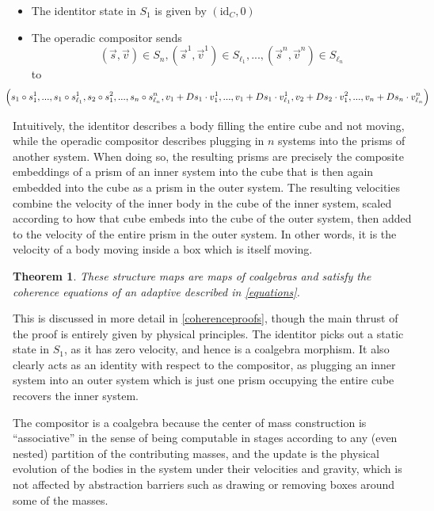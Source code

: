 \documentclass[11pt, one side, article]{memoir}
\theoremstyle{definition}
\theoremstyle{plain}
\newtheorem{theorem}[definitionx]{Theorem}
\newcommand{\id}{\mathrm{id}}
\newcommand{\0}{\textsf{0}}
\newcommand{\1}{\tn{\textsf{1}}}
\newcommand{\blp}{\Big{(}}
\newcommand{\brp}{\Big{)}}
\begin{document}
\begin{itemize}
	\item The identitor state in $S_1$ is given by $(\id_C,0)$
	\item The operadic compositor sends 
$$(\vec s,\vec v) \in S_n, (\vec s^1,\vec v^1) \in S_{\ell_1},...,(\vec s^n,\vec v^n) \in S_{\ell_n}$$
to
$$\hspace{-1cm}\blp s_1 \circ s^1_1,...,s_1 \circ s^1_{\ell_1},s_2 \circ s^2_1,...,s_n \circ s^n_{\ell_n},v_1 + Ds_1 \cdot v^1_1,...,v_1 + Ds_1 \cdot v^1_{\ell_1},v_2 + Ds_2 \cdot v^2_1,...,v_n + Ds_n \cdot v^n_{\ell_n} \brp$$
\end{itemize}

Intuitively, the identitor describes a body filling the entire cube and not moving, while the operadic compositor describes plugging in $n$ systems into the prisms of another system. When doing so, the resulting prisms are precisely the composite embeddings of a prism of an inner system into the cube that is then again embedded into the cube as a prism in the outer system. The resulting velocities combine the velocity of the inner body in the cube of the inner system, scaled according to how that cube embeds into the cube of the outer system, then added to the velocity of the entire prism in the outer system. In other words, it is the velocity of a body moving inside a box which is itself moving.

\begin{theorem}\label{gravityadaptive}
These structure maps are maps of coalgebras and satisfy the coherence equations of an adaptive described in \cref{equations}.
\end{theorem}

This is discussed in more detail in \cref{coherenceproofs}, though the main thrust of the proof is entirely given by physical principles. The identitor picks out a static state in $S_1$, as it has zero velocity, and hence is a coalgebra morphism. It also clearly acts as an identity with respect to the compositor, as plugging an inner system into an outer system which is just one prism occupying the entire cube recovers the inner system. 

The compositor is a coalgebra because the center of mass construction is ``associative'' in the sense of being computable in stages according to any (even nested) partition of the contributing masses, and the update is the physical evolution of the bodies in the system under their velocities and gravity, which is not affected by abstraction barriers such as drawing or removing boxes around some of the masses. 
\end{document}
